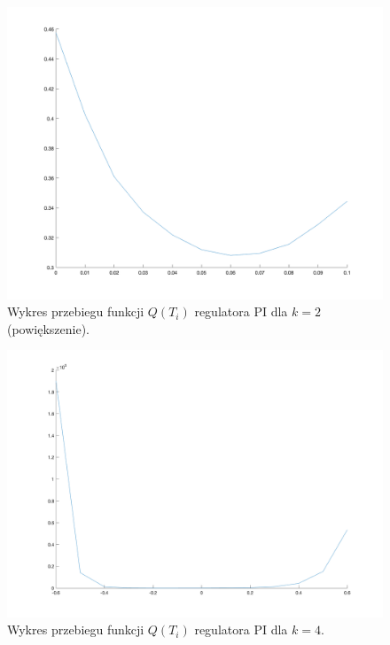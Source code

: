 \documentclass[a4paper,10pt]{article}
\begin{document}
\begin{figure}[!h]
    \centering
	\includegraphics[width=130mm]{PI-opt-k2-zoom.png}
	\caption{Wykres przebiegu funkcji $Q(T_{i})$ regulatora PI dla $k=2$ (powiększenie).}
    \label{fig:regulatorPIk2opt2}
\end{figure}
\begin{figure}[!h]
    \centering
	\includegraphics[width=130mm]{PI-opt-k4.png}
	\caption{Wykres przebiegu funkcji $Q(T_{i})$ regulatora PI dla $k=4$.}
    \label{fig:regulatorPIk4opt1}
\end{figure}
\end{document}
